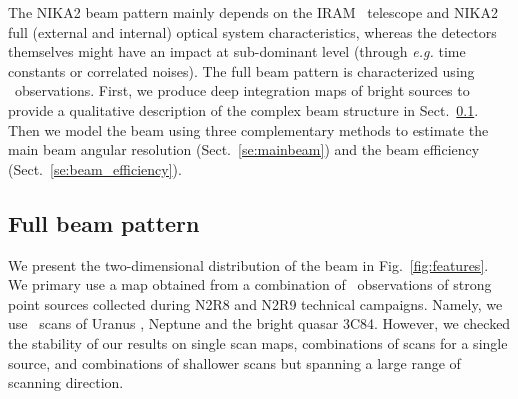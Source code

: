 
The NIKA2 beam pattern mainly depends on the IRAM \trentemetre\ telescope and
NIKA2 full (external and internal) optical system characteristics,
whereas the detectors themselves might have an impact at sub-dominant
level (through \emph{e.g.} time constants or correlated noises).
The full beam pattern is characterized using \bm\ observations. First,
we produce deep integration maps of bright sources to provide a
qualitative description of the complex beam structure in
Sect.~\ref{se:fullbeam}. Then we model the beam using three
complementary methods to estimate the main beam angular resolution
(Sect.~\ref{se:mainbeam}) and the beam efficiency
(Sect.~\ref{se:beam_efficiency}).

\subsection{Full beam pattern}
\label{se:fullbeam}

We present the two-dimensional distribution of the beam in
Fig.~\ref{fig:features}. We primary use a map obtained from a combination
of \bm\ observations of strong point sources collected during
N2R8 and N2R9 technical campaigns. Namely, we use \bm\ scans
of Uranus%
,  Neptune %
and the bright quasar 3C84. %
However, we checked the stability of our results on single scan maps,
combinations of scans for a single source, and combinations of
shallower scans but spanning a large range of scanning direction.


